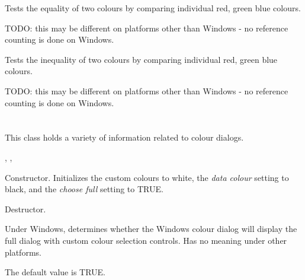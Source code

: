 Tests the equality of two colours by comparing individual red, green blue colours.

TODO: this may be different on platforms other than Windows - no reference counting
is done on Windows.

\label{wxcolourinequality}


Tests the inequality of two colours by comparing individual red, green blue colours.

TODO: this may be different on platforms other than Windows - no reference counting
is done on Windows.

\section{}\label{wxcolourdata}

This class holds a variety of information related to colour dialogs.




, , 


\label{wxcolourdataconstr}


Constructor. Initializes the custom colours to white, the {\it data colour} setting
to black, and the {\it choose full} setting to TRUE.



Destructor.

\label{wxcolourdatagetchoosefull}


Under Windows, determines whether the Windows colour dialog will display the full dialog
with custom colour selection controls. Has no meaning under other platforms.

The default value is TRUE.


